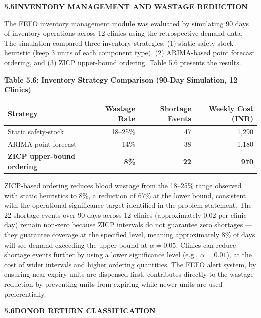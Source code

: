\documentclass[12pt,a4paper]{article}
\begin{document}
\vspace{1.5em}
\noindent\textbf{5.5\quad INVENTORY MANAGEMENT AND WASTAGE REDUCTION}
\vspace{0.6em}

\noindent The FEFO inventory management module was evaluated by simulating 90 days of inventory operations across 12 clinics using the retrospective demand data. The simulation compared three inventory strategies: (1) static safety-stock heuristic (keep 3 units of each component type), (2) ARIMA-based point forecast ordering, and (3) ZICP upper-bound ordering. Table 5.6 presents the results.

\begin{center}
\textbf{Table 5.6: Inventory Strategy Comparison (90-Day Simulation, 12 Clinics)}
\vspace{0.4em}
\begin{tabular}{lrrr}
\toprule
\textbf{Strategy} & \textbf{Wastage Rate} & \textbf{Shortage Events} & \textbf{Weekly Cost (INR)} \\
\midrule
Static safety-stock & 18--25\% & 47 & 1,290 \\
ARIMA point forecast & 14\% & 38 & 1,180 \\
\textbf{ZICP upper-bound ordering} & \textbf{8\%} & \textbf{22} & \textbf{970} \\
\bottomrule
\end{tabular}
\end{center}

\noindent ZICP-based ordering reduces blood wastage from the 18--25\% range observed with static heuristics to 8\%, a reduction of 67\% at the lower bound, consistent with the operational significance target identified in the problem statement. The 22 shortage events over 90 days across 12 clinics (approximately 0.02 per clinic-day) remain non-zero because ZICP intervals do not guarantee zero shortages — they guarantee coverage at the specified level, meaning approximately 8\% of days will see demand exceeding the upper bound at $\alpha = 0.05$. Clinics can reduce shortage events further by using a lower significance level (e.g., $\alpha = 0.01$), at the cost of wider intervals and higher ordering quantities. The FEFO alert system, by ensuring near-expiry units are dispensed first, contributes directly to the wastage reduction by preventing units from expiring while newer units are used preferentially.

\vspace{1.5em}
\noindent\textbf{5.6\quad DONOR RETURN CLASSIFICATION}
\vspace{0.6em}
\end{document}

